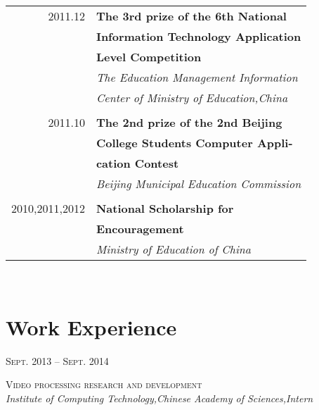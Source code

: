 \documentclass[10pt,a4paper]{article} %
\begin{document}
\begin{minipage}[t]{0.44\textwidth}
\begin{tabular}{rl}
2011.12     & \small\textbf{The 3rd prize of the 6th National} \\
& \small\textbf{ Information Technology Application }\\
& \small\textbf{ Level Competition}\\
& \small\textit{The Education Management Information}\\
& \small\textit{ Center of Ministry of Education,China}\\ \\

2011.10     & \small\textbf{The 2nd prize of the 2nd Beijing}\\
& \small\textbf{ College Students Computer Appli-}\\
& \small\textbf{ cation Contest}\\
& \small\textit{Beijing Municipal Education Commission}\\ \\

2010,2011,2012    & \small\textbf{National Scholarship for }\\
& \small\textbf{ Encouragement}\\
& \small\textit{Ministry of Education of China}

\end{tabular}\\[0pt]


\section{Work Experience}
{\raggedleft\textsc{Sept. 2013 -- Sept. 2014}\par}

{\raggedright \small\textsc{Video processing research and development }\\

\textit{ Institute of Computing Technology,Chinese Academy of Sciences,Intern}\\}


\end{minipage}
\end{document}
